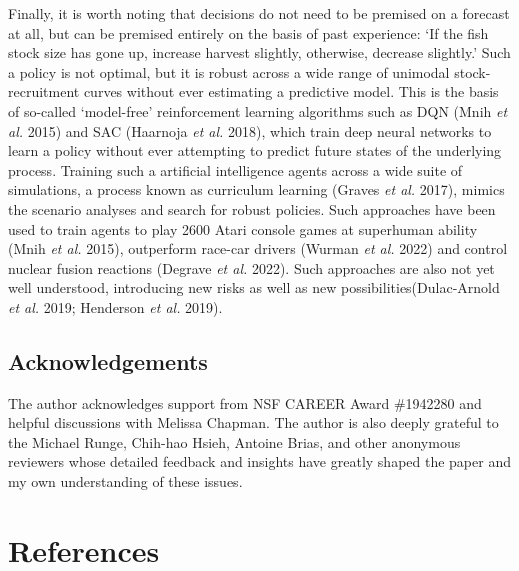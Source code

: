\documentclass[3p]{elsarticle} %
\begin{document}
Finally, it is worth noting that decisions do not need to be premised on
a forecast at all, but can be premised entirely on the basis of past
experience: `If the fish stock size has gone up, increase harvest
slightly, otherwise, decrease slightly.' Such a policy is not optimal,
but it is robust across a wide range of unimodal stock-recruitment
curves without ever estimating a predictive model. This is the basis of
so-called `model-free' reinforcement learning algorithms such as DQN
(Mnih \emph{et al.} 2015) and SAC (Haarnoja \emph{et al.} 2018), which
train deep neural networks to learn a policy without ever attempting to
predict future states of the underlying process. Training such a
artificial intelligence agents across a wide suite of simulations, a
process known as curriculum learning (Graves \emph{et al.} 2017), mimics
the scenario analyses and search for robust policies. Such approaches
have been used to train agents to play 2600 Atari console games at
superhuman ability (Mnih \emph{et al.} 2015), outperform race-car
drivers (Wurman \emph{et al.} 2022) and control nuclear fusion reactions
(Degrave \emph{et al.} 2022). Such approaches are also not yet well
understood, introducing new risks as well as new
possibilities(Dulac-Arnold \emph{et al.} 2019; Henderson \emph{et al.}
2019).

\hypertarget{acknowledgements}{%
\subsection{Acknowledgements}\label{acknowledgements}}

The author acknowledges support from NSF CAREER Award \#1942280 and
helpful discussions with Melissa Chapman. The author is also deeply
grateful to the Michael Runge, Chih-hao Hsieh, Antoine Brias, and other
anonymous reviewers whose detailed feedback and insights have greatly
shaped the paper and my own understanding of these issues.

\pagebreak

\hypertarget{references}{%
\section*{References}\label{references}}
\end{document}
